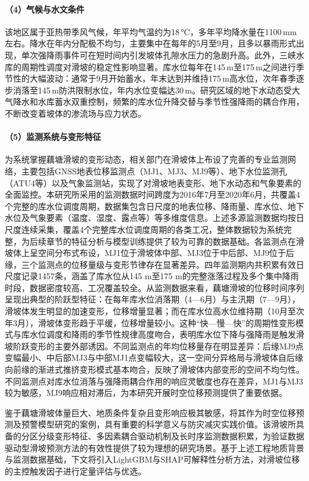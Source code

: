 \documentclass[12pt,a4paper]{article}
\begin{document}
\paragraph{（4）气候与水文条件}

该地区属于亚热带季风气候，年平均气温约为18\,°C，多年平均降水量在1100\,mm左右。降水在年内分配极不均匀，主要集中在每年的5月至9月，且多以暴雨形式出现，单次强降雨事件可在短时间内引发坡体孔隙水压力的急剧升高。此外，三峡水库的周期性调度对滑坡的稳定性影响显著。库水位每年在145\,m至175\,m之间进行季节性的大幅波动：通常于9月开始蓄水，年末达到并维持175\,m高水位，次年春季逐步消落至145\,m防洪限制水位，年内水位变幅达30\,m。研究区域的地下水动态受大气降水和水库蓄水双重控制，频繁的库水位升降交替与季节性强降雨的耦合作用，不断改变着坡体的渗流场与应力状态。

\paragraph{（5）监测系统与变形特征}

为系统掌握藕塘滑坡的变形动态，相关部门在滑坡体上布设了完善的专业监测网络，主要包括GNSS地表位移监测点（MJ1、MJ3、MJ9等）、地下水位监测孔（ATU4等）以及气象监测站，实现了对滑坡地表变形、地下水动态和气象要素的全面监控\cite{li2025ps,dzt2023}。本研究所采用的监测数据时间跨度为2016年7月至2020年6月，共覆盖4个完整的库水位调度周期，数据集包含日尺度的地表位移、降雨量、库水位、地下水位及气象要素（温度、湿度、露点等）等多维度信息。上述多源监测数据均按日尺度连续采集，覆盖4个完整库水位调度周期的各类工况，整体数据较为系统完整，为后续章节的特征分析与模型训练提供了较为可靠的数据基础。各监测点在滑坡体上呈空间分布式布设，MJ1位于滑坡体中部、MJ3位于中后部、MJ9位于后缘，三个监测点的位移量级与变形节律存在显著差异。四年监测期内共积累有效日尺度记录1457条，涵盖了库水位从145 m至175 m的完整涨落过程及多个集中降雨时段，数据密度较高、工况覆盖较全。从监测数据来看，藕塘滑坡的位移时间序列呈现出典型的阶跃型特征：在每年库水位消落期（4—6月）与主汛期（7—9月），滑坡体发生明显的加速变形，位移增量显著；而在库水位高水位维持期（10月至次年3月），滑坡体变形趋于平缓，位移增量较小。这种“快—慢—快”的周期性变形模式与库水位调度和降雨的季节性规律高度吻合，表明库水位下降与强降雨是触发滑坡阶跃变形的主要外部诱因。不同监测点的年均位移量存在明显差异：后缘MJ9点变幅最小、中后部MJ3与中部MJ1点变幅较大，这一空间分异格局与滑坡体自后缘向前缘的渐进式推挤变形模式基本吻合，反映了滑坡体内部变形的空间不均匀性。不同监测点对库水位消落与强降雨耦合作用的响应灵敏度也存在差异，MJ1与MJ3较为敏感，MJ9响应相对滞后，为本研究开展时空位移预测提供了重要依据。

鉴于藕塘滑坡体量巨大、地质条件复杂且变形响应极其敏感，将其作为时空位移预测及预警模型研究的案例，具有重要的科学意义与防灾减灾实践价值。该滑坡所具备的分区分级变形特征、多因素耦合驱动机制及长时序监测数据积累，为验证数据驱动型滑坡预测方法的有效性提供了较为理想的研究场景。基于上述工程地质背景与监测数据基础，下文将引入LightGBM与SHAP可解释性分析方法，对滑坡位移的主控触发因子进行定量评估与优选。
\end{document}
